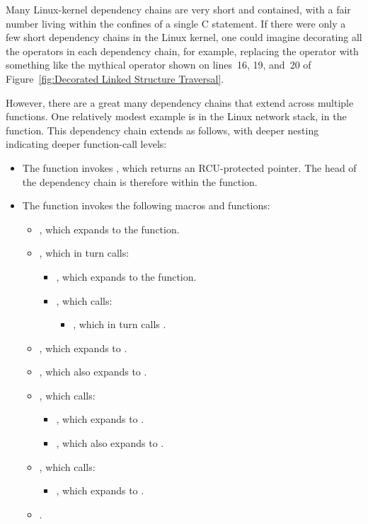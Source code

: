 \documentclass[letterpaper,twocolumn,10pt]{article}
\begin{document}
Many Linux-kernel dependency chains are very short and contained,
with a fair number living within the confines of a single C statement.
If there were only a few short dependency chains in the Linux kernel,
one could imagine decorating all the operators in each dependency
chain, for example, replacing the \co{->} operator with something
like the mythical  operator shown on lines~16,
19, and~20 of
Figure~\ref{fig:Decorated Linked Structure Traversal}.

However, there are a great many dependency chains that extend across
multiple functions.
One relatively modest example is in the Linux network stack, in
the  function.
This dependency chain extends as follows, with deeper nesting indicating
deeper function-call levels:

\begin{itemize}
\item	The  function invokes ,
	which returns an RCU-protected pointer.
	The head of the dependency chain is therefore within
	the  function.
\item	The  function invokes the following macros
	and functions:
	\begin{itemize}
	\item	{}, which expands to
		the  function.
	\item	{}, which in turn calls:
		\begin{itemize}
		\item	{}, which expands to the
			 function.
		\item	{}, which calls:
			\begin{itemize}
			\item	{}, which in turn calls
				.
			\end{itemize}
		\end{itemize}
	\item	{}, which expands to
		.
	\item	{}, which also expands to
		.
	\item	{}, which calls:
		\begin{itemize}
		\item	{}, which expands to
			.
		\item	{}, which also expands to
			.
		\end{itemize}
	\item	{}, which calls:
		\begin{itemize}
		\item	{}, which expands to
			.
		\end{itemize}
	\item	{}.
	\end{itemize}
\end{itemize}
\end{document}
